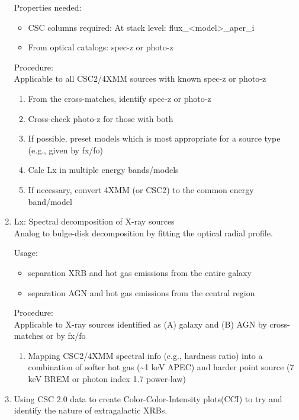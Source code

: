 \begin{enumerate}
  Properties needed:
  \begin{itemize}
  \item CSC columns required: At stack level: flux\_<model>\_aper\_i
  \item From optical catalogs: spec-z or photo-z
  \end{itemize}
  Procedure: \\
  Applicable to all CSC2/4XMM sources with known spec-z or photo-z
  \begin{enumerate}
  \item From the cross-matches, identify spec-z or photo-z
  \item Cross-check photo-z for those with both
  \item If possible, preset models which is most appropriate for a source type (e.g., given by fx/fo) 
  \item Calc Lx in multiple energy bands/models
  \item If necessary, convert 4XMM (or CSC2) to the common energy band/model
  \end{enumerate}
\item Lx: Spectral decomposition of X-ray sources \\
  Analog to bulge-disk decomposition by fitting the optical radial profile.
  
  Usage:
  \begin{itemize}
  \item separation XRB and hot gas emissions from the entire galaxy
  \item separation AGN and hot gas emissions from the central region
  \end{itemize}
  Procedure: \\
  Applicable to X-ray sources identified as (A) galaxy and (B) AGN by cross-matches or by fx/fo
  \begin{enumerate}
    \item Mapping CSC2/4XMM spectral info (e.g., hardness ratio) into a combination of softer hot gas (\textasciitilde1 keV APEC) 
          and harder point source (7 keV BREM or photon index 1.7 power-law) 
  \end{enumerate}  
\item Using CSC 2.0 data to create Color-Color-Intensity plots(CCI) to try and identify the nature of extragalactic XRBs. \\
%
\end{enumerate}

